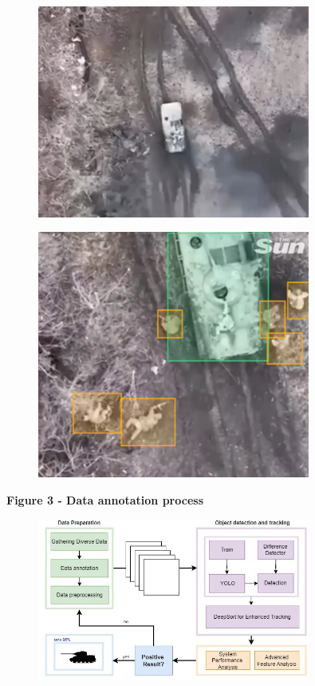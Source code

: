 \begin{figure}[H]
	\centering
	\includegraphics[width=0.8\textwidth]{assets/13}
	\caption*{}
\end{figure}\begin{figure}[H]
	\centering
	\includegraphics[width=0.8\textwidth]{assets/14}
	\caption*{}
\end{figure}

\textbf{Figure 3 - Data annotation process}

\begin{figure}[H]
	\centering
	\includegraphics[width=0.8\textwidth]{assets/15}
	\caption*{}
\end{figure}

